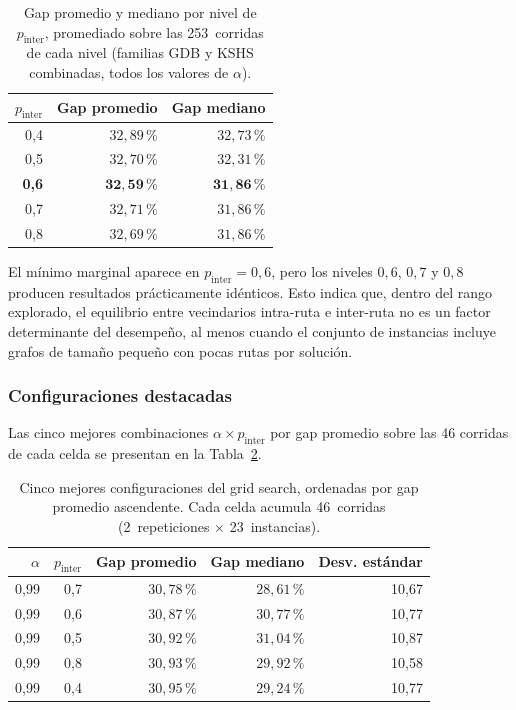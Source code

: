 \begin{table}[htbp]
  \centering
  \caption{%
    Gap promedio y mediano por nivel de \(p_{\text{inter}}\), promediado sobre las
    253~corridas de cada nivel (familias GDB y KSHS combinadas, todos los valores
    de \(\alpha\)).%
  }
  \label{tab:efecto_pinter}
  \begin{tabular}{r r r}
    \toprule
    \(p_{\text{inter}}\) & Gap promedio & Gap mediano \\
    \midrule
    0{,}4 & \(32{,}89\,\%\) & \(32{,}73\,\%\) \\
    0{,}5 & \(32{,}70\,\%\) & \(32{,}31\,\%\) \\
    \textbf{0{,}6} & \(\mathbf{32{,}59\,\%}\) & \(\mathbf{31{,}86\,\%}\) \\
    0{,}7 & \(32{,}71\,\%\) & \(31{,}86\,\%\) \\
    0{,}8 & \(32{,}69\,\%\) & \(31{,}86\,\%\) \\
    \bottomrule
  \end{tabular}
\end{table}

El mínimo marginal aparece en \(p_{\text{inter}} = 0{,}6\), pero los niveles
\(0{,}6\), \(0{,}7\) y \(0{,}8\) producen resultados prácticamente idénticos. Esto
indica que, dentro del rango explorado, el equilibrio entre vecindarios intra-ruta e
inter-ruta no es un factor determinante del desempeño, al menos cuando el conjunto de
instancias incluye grafos de tamaño pequeño con pocas rutas por solución.

\subsubsection{Configuraciones destacadas}
\label{subsubsec:configs_destacadas}

Las cinco mejores combinaciones \(\alpha \times p_{\text{inter}}\) por gap promedio
sobre las 46 corridas de cada celda se presentan en la Tabla~\ref{tab:configs_destacadas}.

\begin{table}[htbp]
  \centering
  \caption{%
    Cinco mejores configuraciones del grid search, ordenadas por gap promedio ascendente.
    Cada celda acumula 46~corridas (2~repeticiones \(\times\) 23~instancias).%
  }
  \label{tab:configs_destacadas}
  \begin{tabular}{r r r r r}
    \toprule
    \(\alpha\) & \(p_{\text{inter}}\) & Gap promedio & Gap mediano & Desv. estándar \\
    \midrule
    0{,}99 & 0{,}7 & \(30{,}78\,\%\) & \(28{,}61\,\%\) & 10{,}67 \\
    0{,}99 & 0{,}6 & \(30{,}87\,\%\) & \(30{,}77\,\%\) & 10{,}77 \\
    0{,}99 & 0{,}5 & \(30{,}92\,\%\) & \(31{,}04\,\%\) & 10{,}87 \\
    0{,}99 & 0{,}8 & \(30{,}93\,\%\) & \(29{,}92\,\%\) & 10{,}58 \\
    0{,}99 & 0{,}4 & \(30{,}95\,\%\) & \(29{,}24\,\%\) & 10{,}77 \\
    \bottomrule
  \end{tabular}
\end{table}

